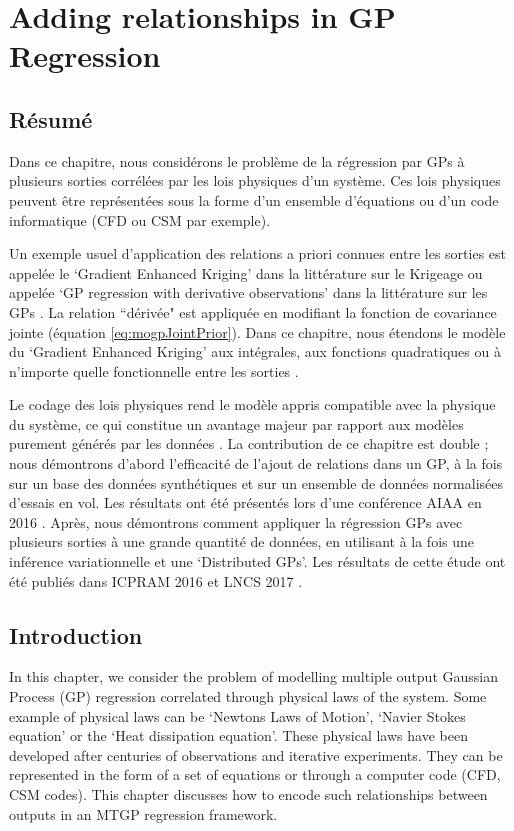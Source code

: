 \chapter{Adding relationships in GP Regression}
\label{chapAddingEquationsInGP}

\begin{mdframed}[hidealllines=true,backgroundcolor=lightgray!20]
\section*{Résumé}
Dans ce chapitre, nous considérons le problème de la régression par GPs à plusieurs sorties corrélées par les lois physiques d'un système. Ces lois physiques peuvent être représentées sous la forme d'un ensemble d'équations ou d'un code informatique (CFD ou CSM par exemple).

Un exemple usuel d'application des relations a priori connues entre les sorties est appelée le `Gradient Enhanced Kriging' dans la littérature sur le Krigeage  \cite{chung2002using, morris1993bayesian, forrester2009recent} ou appelée `GP regression with derivative observations' dans la littérature sur les GPs \cite{NIPSDerivativeGP}. La relation ``dérivée" est appliquée en modifiant la fonction de covariance jointe (équation \ref{eq:mogpJointPrior}). Dans ce chapitre, nous étendons le modèle du `Gradient Enhanced Kriging' aux intégrales, aux fonctions quadratiques ou à n’importe quelle fonctionnelle entre les sorties \cite{ Constantinescu2013}.

Le codage des lois physiques rend le modèle appris compatible avec la physique du système, ce qui constitue un avantage majeur par rapport aux modèles purement générés par les données \cite{jazwinski2007stochastic}. La contribution de ce chapitre est double ; nous démontrons d'abord l'efficacité de l'ajout de relations dans un GP, à la fois sur un base des données  synthétiques et sur un ensemble de données normalisées d'essais en vol. Les résultats ont été présentés lors d'une conférence AIAA en 2016 \cite{oatao18001}. Après, nous démontrons comment appliquer la régression GPs avec plusieurs sorties à une grande quantité de données, en utilisant à la fois une inférence variationnelle et une `Distributed GPs’. Les résultats de cette étude ont été publiés dans ICPRAM 2016 et LNCS 2017 \cite{icpram16Ankit, oatao18000}.
\end{mdframed}



\section{Introduction}
In this chapter, we consider the problem of modelling multiple output Gaussian Process (GP) regression correlated through physical laws of the system. Some example of physical laws can be `Newtons Laws of Motion', `Navier Stokes equation' or the `Heat dissipation equation'. These physical laws have been developed after centuries of observations and iterative experiments. They can be represented in the form of a set of equations or through a computer code (CFD, CSM codes). This chapter discusses how to encode such relationships between outputs in an MTGP regression framework. 

